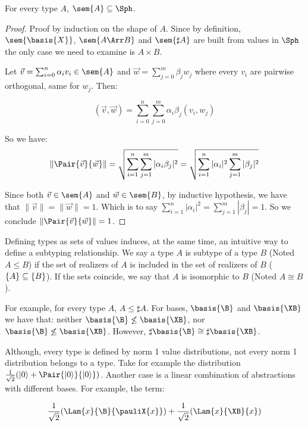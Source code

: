 \begin{proposition}\label{prop:UnitaryTypes}
  For every type $A$, $\sem{A}\subseteq\Sph$.
\end{proposition}

\begin{proof}
  Proof by induction on the shape of $A$. Since by definition, $\sem{\basis{X}}$, $\sem{A\Arr B}$ and $\sem{\sharp{A}}$ are built from values in $\Sph$ the only case we need to examine is $A\times B$.
  
  Let $\vec v = \sum_{i=0}^{n} \alpha_i v_i \in\sem{A}$ and $\vec w = \sum_{j=0}^{m} \beta_j w_j$ where every $v_i$ are pairwise orthogonal, same for $w_j$. Then:
     
  \[(\vec v, \vec w) = \sum_{i=0}^{n} \sum_{j=0}^{m} \alpha_i\beta_j (v_i,w_j)\]
  
  So we have: 
  \[\|\Pair{\vec v}{\vec w}\| = \sqrt{\sum_{i=1}^n\sum_{j=1}^{m} |\alpha_i\beta_j|^2} = \sqrt{\sum_{i=1}^n |\alpha_i|^2 \sum_{j=1}^{m} |\beta_j|^2}\]

  Since both $\vec v\in\sem{A}$ and $\vec w\in\sem{B}$, by inductive hypothesis, we have that $\|\vec v\| = \| \vec w \| = 1$. Which is to say $\sum_{i=1}^{n} |\alpha_i|^2 = \sum_{j=1}^{m} |\beta_j| = 1$. So we conclude $\|\Pair{\vec{v}}{\vec{w}}\| = 1$.
  
\end{proof}

Defining types as sets of values induces, at the same time, an intuitive way to define a subtyping relationship. We say a type $A$ is subtype of a type $B$ (Noted $A\leq B$) if the set of realizers of $A$ is included in the set of realizers of $B$ ($\{\real A\}\subseteq\{\real B\}$). If the sets coincide, we say that $A$ is isomorphic to $B$ (Noted $A\cong B$). 

\begin{example}
  For example, for every type $A$, $A\leq\sharp A$. For bases, $\basis{\B}$ and $\basis{\XB}$ we have that: neither $\basis{\B}\not\leq\basis{\XB}$, nor $\basis{\B}\not\leq\basis{\XB}$. However, $\sharp\basis{\B}\cong\sharp\basis{\XB}$.
\end{example}

Although, every type is defined by norm 1 value distributions, not every norm 1 distribution belongs to a type. Take for example the distribution $\frac{1}{\sqrt{2}} (\ket{0} + \Pair{\ket{0}}{\ket 0})$. Another case is a linear combination of abstractions with different bases. For example, the term:

\[
\frac{1}{\sqrt{2}}(\Lam{x}{\B}{\pauliX{x}}) + \frac{1}{\sqrt{2}}(\Lam{x}{\XB}{x})
\]

